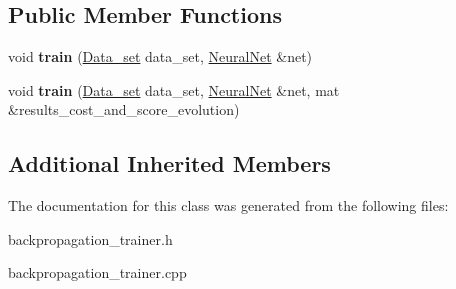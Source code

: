 \subsection*{Public Member Functions}
\begin{DoxyCompactItemize}
\item 
\hypertarget{classBackpropagation__trainer_a06428f49ed527482daf4a0aa633a9ba7}{void {\bfseries train} (\hyperlink{classData__set}{Data\-\_\-set} data\-\_\-set, \hyperlink{classNeuralNet}{Neural\-Net} \&net)}\label{classBackpropagation__trainer_a06428f49ed527482daf4a0aa633a9ba7}

\item 
\hypertarget{classBackpropagation__trainer_a92736ecef749b201f345d9431b8ce810}{void {\bfseries train} (\hyperlink{classData__set}{Data\-\_\-set} data\-\_\-set, \hyperlink{classNeuralNet}{Neural\-Net} \&net, mat \&results\-\_\-cost\-\_\-and\-\_\-score\-\_\-evolution)}\label{classBackpropagation__trainer_a92736ecef749b201f345d9431b8ce810}

\end{DoxyCompactItemize}
\subsection*{Additional Inherited Members}


The documentation for this class was generated from the following files\-:\begin{DoxyCompactItemize}
\item 
backpropagation\-\_\-trainer.\-h\item 
backpropagation\-\_\-trainer.\-cpp\end{DoxyCompactItemize}
